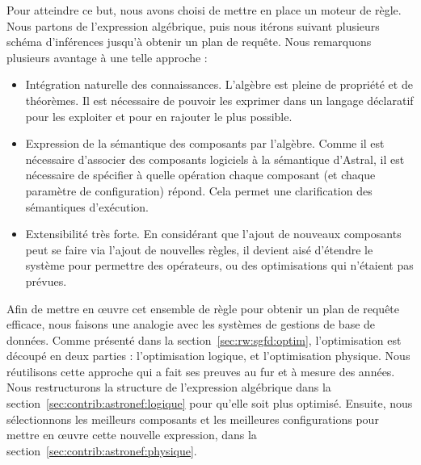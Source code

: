 Pour atteindre ce but, nous avons choisi de mettre en place un moteur de règle. Nous partons de l'expression algébrique, puis nous itérons suivant plusieurs schéma d'inférences jusqu'à obtenir un plan de requête. Nous remarquons plusieurs avantage à une telle approche :
\begin{itemize}
	\item Intégration naturelle des connaissances. L'algèbre est pleine de propriété et de théorèmes. Il est nécessaire de pouvoir les exprimer dans un langage déclaratif pour les exploiter et pour en rajouter le plus possible.
	\item Expression de la sémantique des composants par l'algèbre. Comme il est nécessaire d'associer des composants logiciels à la sémantique d'Astral, il est nécessaire de spécifier à quelle opération chaque composant (et chaque paramètre de configuration) répond. Cela permet une clarification des sémantiques d'exécution.
	\item Extensibilité très forte. En considérant que l'ajout de nouveaux composants peut se faire via l'ajout de nouvelles règles, il devient aisé d'étendre le système pour permettre des opérateurs, ou des optimisations qui n'étaient pas prévues.
\end{itemize}

Afin de mettre en œuvre cet ensemble de règle pour obtenir un plan de requête efficace, nous faisons une analogie avec les systèmes de gestions de base de données. Comme présenté dans la section~\ref{sec:rw:sgfd:optim}, l'optimisation est découpé en deux parties : l'optimisation logique, et l'optimisation physique. Nous réutilisons cette approche qui a fait ses preuves au fur et à mesure des années. Nous restructurons la structure de l'expression algébrique dans la section~\ref{sec:contrib:astronef:logique} pour qu'elle soit plus optimisé. Ensuite, nous sélectionnons les meilleurs composants et les meilleures configurations pour mettre en œuvre cette nouvelle expression, dans la section~\ref{sec:contrib:astronef:physique}.

